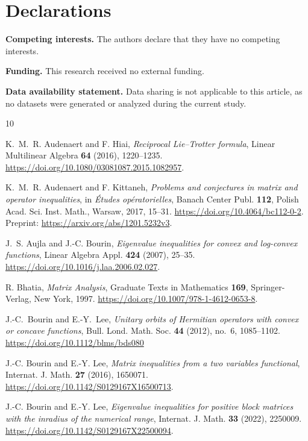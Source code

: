 \documentclass[11pt]{amsart}
\numberwithin{equation}{section}
\begin{document}
\section*{Declarations}

\noindent\textbf{Competing interests.}
The authors declare that they have no competing interests.

\medskip

\noindent\textbf{Funding.}
This research received no external funding.

\medskip

\noindent\textbf{Data availability statement.}
Data sharing is not applicable to this article, as no datasets were generated or analyzed during the current study.


\begin{thebibliography}{10}

K.~M.~R. Audenaert and F. Hiai,
\emph{Reciprocal Lie--Trotter formula},
Linear Multilinear Algebra \textbf{64} (2016), 1220--1235.
\url{https://doi.org/10.1080/03081087.2015.1082957}.

K.~M.~R. Audenaert and F. Kittaneh,
\emph{Problems and conjectures in matrix and operator inequalities},
in \emph{\'Etudes op\'eratorielles}, Banach Center Publ. \textbf{112},
Polish Acad. Sci. Inst. Math., Warsaw, 2017, 15--31.
\url{https://doi.org/10.4064/bc112-0-2}.
Preprint: \url{https://arxiv.org/abs/1201.5232v3}.

J.~S. Aujla and J.-C. Bourin,
\emph{Eigenvalue inequalities for convex and log-convex functions},
Linear Algebra Appl. \textbf{424} (2007), 25--35.
\url{https://doi.org/10.1016/j.laa.2006.02.027}.

R. Bhatia,
\emph{Matrix Analysis},
Graduate Texts in Mathematics \textbf{169}, Springer-Verlag, New York, 1997.
\url{https://doi.org/10.1007/978-1-4612-0653-8}.

J.-C.~Bourin and E.-Y.~Lee,
\emph{Unitary orbits of Hermitian operators with convex or concave functions},
Bull. Lond. Math. Soc. \textbf{44} (2012), no.~6, 1085--1102.
\url{https://doi.org/10.1112/blms/bds080}

J.-C. Bourin and E.-Y. Lee,
\emph{Matrix inequalities from a two variables functional},
Internat. J. Math. \textbf{27} (2016), 1650071.
\url{https://doi.org/10.1142/S0129167X16500713}.

J.-C. Bourin and E.-Y. Lee,
\emph{Eigenvalue inequalities for positive block matrices with the inradius of the numerical range},
Internat. J. Math. \textbf{33} (2022), 2250009.
\url{https://doi.org/10.1142/S0129167X22500094}.


\end{thebibliography}
\end{document}
